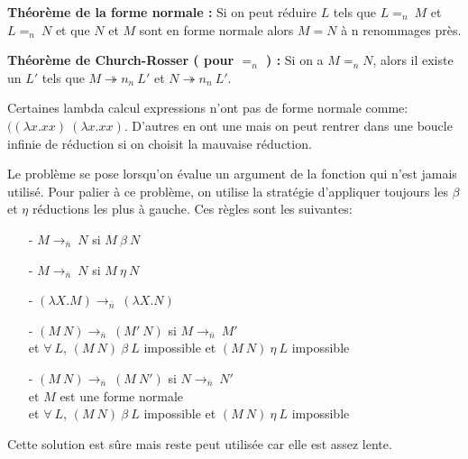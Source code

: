\documentclass[10pt,a4paper]{article}
\begin{document}
				\textbf{Théorème de la forme normale :}
				Si on peut réduire $L$ tels que $L =_{n}~M$ et $L =_{n}~N$ et que $N$ et $M$ sont en forme normale alors $M = N$ à n renommages près.
				\medbreak	
			
				\textbf{Théorème de Church-Rosser ( pour $=_{n}$ ) :}
				Si on a $M =_{n} N$, alors il existe un $L'$ tels que $M \twoheadrightarrow n_{n}~L'$ et $N \twoheadrightarrow n_{n}~L'$.
				\medbreak
			
				Certaines lambda calcul expressions n'ont pas de forme normale comme: $((\lambda x.x x)~(\lambda x.x x)$. 
				D'autres en ont une mais on peut rentrer dans une boucle infinie de réduction si on choisit la mauvaise réduction.
				\medbreak
			
				Le problème se pose lorsqu'on évalue un argument de la fonction qui n'est jamais utilisé. Pour palier à ce problème, on utilise la stratégie d'appliquer toujours les $\beta$ et $\eta$ réductions les plus à gauche. Ces règles sont les suivantes:
				\begin{itemize}
					\item[-] $M \longrightarrow_{\bar{n}}~N$ si $M~\beta~N$
					\item[-] $M \longrightarrow_{\bar{n}}~N$ si $M~\eta~N$
					\item[-] $(\lambda X.M) \longrightarrow_{\bar{n}}~(\lambda X.N)$
					\item[-] $(M~N) \longrightarrow_{\bar{n}}~(M'~N)$ si $M \longrightarrow_{\bar{n}}~M'$
					\\ et $\forall~L$, $(M~N)~\beta~L$ impossible et $(M~N)~\eta~L$ impossible
					\item[-] $(M~N) \longrightarrow_{\bar{n}}~(M~N')$ si $N \longrightarrow_{\bar{n}}~N'$
					\\ et $M$ est une forme normale
					\\ et  $\forall~L$, $(M~N)~\beta~L$ impossible et $(M~N)~\eta~L$ impossible
				\end{itemize}
				\smallbreak
				Cette solution est sûre mais reste peut utilisée car elle est assez lente. 
				\medbreak
				
\end{document}
